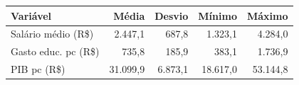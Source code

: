 \begin{tabular}{lrrrr}
\toprule
Variável & Média & Desvio & Mínimo & Máximo \\
\midrule
Salário médio (R\$) & 2.447,1 & 687,8 & 1.323,1 & 4.284,0 \\
Gasto educ. pc (R\$) & 735,8 & 185,9 & 383,1 & 1.736,9 \\
PIB pc (R\$) & 31.099,9 & 6.873,1 & 18.617,0 & 53.144,8 \\
\bottomrule
\end{tabular}
